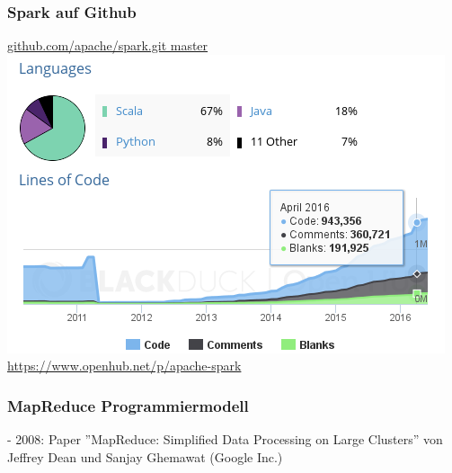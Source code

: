 \begin{frame}
    \frametitle{Spark auf Github}
    \url{github.com/apache/spark.git master}\\
    \includegraphics[width=\linewidth]{spark-openhub.png}\\
    \textcolor{gray}{\scriptsize{\url{
        https://www.openhub.net/p/apache-spark
    }}}
\end{frame}


\begin{frame}
    \frametitle{MapReduce Programmiermodell}
    - 2008: Paper ''MapReduce: Simplified Data Processing on Large Clusters'' von Jeffrey Dean und Sanjay Ghemawat (Google Inc.)
\end{frame}


